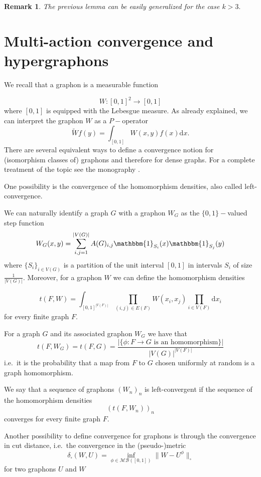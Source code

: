 \documentclass[11pt]{article}
\newtheorem{remark}[theorem]{Remark}
\begin{document}
\begin{remark}
    The previous lemma can be easily generalized for the case $k>3.$
\end{remark}

\section{Multi-action convergence and hypergraphons}\label{SectHypergraphons}
We recall that a graphon is a measurable function 

$$
W:[0,1]^2\longrightarrow[0,1]$$
where  $[0,1]$ is equipped with the Lebesgue measure. As already explained, we can interpret the graphon $W$ as a $P-$operator 
$$\widetilde{W}f(y)=\int_{[0,1]}W(x,y)f(x)\mathrm{d}x.$$
There are several equivalent ways to define a convergence notion for (isomorphism classes of) graphons and therefore for dense graphs. For a complete treatment of the topic see the monography \cite{LovaszGraphLimits}.

One possibility is the convergence of the homomorphism densities, also called left-convergence.

We can naturally identify a graph $G$ with a graphon $W_G$ as the $\{0,1\}-$valued  step function  
$$
W_G(x,y)= \sum^{|V(G)|}_{i,j=1}A(G)_{i,j}\mathbbm{1}_{S_i}(x)\mathbbm{1}_{S_j}(y)
$$
where $\{S_i\}_{i\in V(G)}$ is a partition of the unit interval $[0,1]$ in intervals $S_i$ of size $\frac{1}{|V(G)|}$.
Moreover, for a graphon $W$ we can define the homomorphism densities  

$$
t(F,W)=\int_{[0,1]^{|V(F)|}}\prod_{(i,j)\in E(F)}W(x_i,x_j)\prod_{i\in V(F)}\mathrm{d}x_i
$$
for every finite graph $F$.

For a graph $G$ and its associated graphon $W_G$ we have that 
$$
t(F,W_G)=t(F,G)=\frac{|\{\phi : F\rightarrow G \text{ is an homomorphism}\}|}{|V(G)|^{|V(F)|}}
$$
i.e.\ it is the probability that a map from $F$ to $G$ chosen uniformly at random is a graph homomorphism.

We say that a sequence of graphons $(W_n)_n$ is left-convergent if the sequence of the homomorphism densities 
$$(t(F,W_n))_n$$ converges for every finite graph $F$.

Another possibility to define convergence for graphons is through the convergence in cut distance, i.e.\ the convergence in the (pseudo-)metric 
\begin{equation}\label{eqn:cutdist}
    \delta_{\square}(W,U)=\inf_{\phi\in \mathcal{MB}([0,1])}\|W-U^{\phi}\|_{\square}
\end{equation}
for two graphons $U$ and $W$
\end{document}
